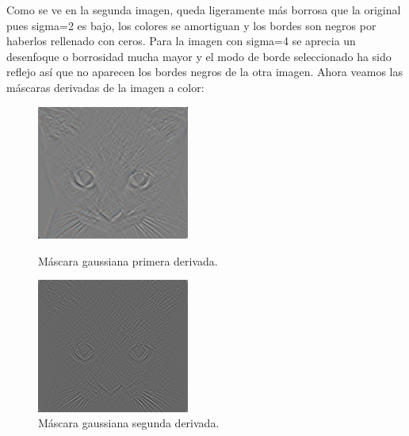 \documentclass[12pt]{article}
\begin{document}
Como se ve en la segunda imagen, queda ligeramente más borrosa que la original pues sigma=2 es bajo, los colores se amortiguan y los bordes son negros por haberlos rellenado con ceros. Para la imagen con sigma=4 se aprecia un desenfoque o borrosidad mucha mayor y el modo de borde seleccionado ha sido reflejo así que no aparecen los bordes negros de la otra imagen. Ahora veamos las máscaras derivadas de la imagen a color:\\
\begin{figure}[H]
\centering
\parbox{5cm}{
\includegraphics[width=5cm]{images/GaussianCatDeriv.png}
\caption{Máscara gaussiana primera derivada.}
\label{fig:2figsA}}
\qquad
\begin{minipage}{5cm}
\includegraphics[width=5cm]{images/GaussianCatDeriv2.png}
\caption{Máscara gaussiana segunda derivada.}
\label{fig:2figsB}
\end{minipage}
\end{figure}
\end{document}

